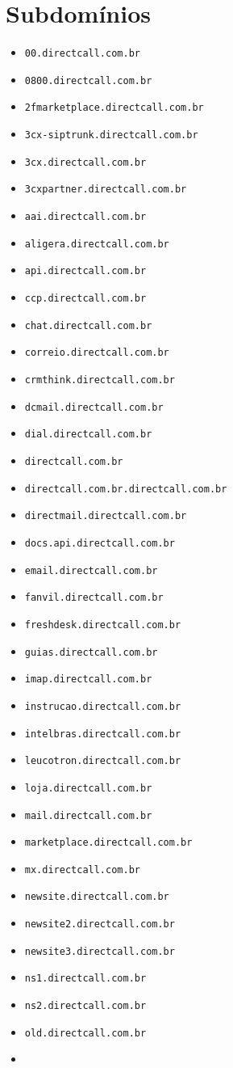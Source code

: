 
\section{Subdomínios}
\begin{multicols}{2}  %
\begin{itemize}
\item \texttt{00.directcall.com.br}\item \texttt{0800.directcall.com.br}\item \texttt{2fmarketplace.directcall.com.br}\item \texttt{3cx-siptrunk.directcall.com.br}\item \texttt{3cx.directcall.com.br}\item \texttt{3cxpartner.directcall.com.br}\item \texttt{aai.directcall.com.br}\item \texttt{aligera.directcall.com.br}\item \texttt{api.directcall.com.br}\item \texttt{ccp.directcall.com.br}\item \texttt{chat.directcall.com.br}\item \texttt{correio.directcall.com.br}\item \texttt{crmthink.directcall.com.br}\item \texttt{dcmail.directcall.com.br}\item \texttt{dial.directcall.com.br}\item \texttt{directcall.com.br}\item \texttt{directcall.com.br.directcall.com.br}\item \texttt{directmail.directcall.com.br}\item \texttt{docs.api.directcall.com.br}\item \texttt{email.directcall.com.br}\item \texttt{fanvil.directcall.com.br}\item \texttt{freshdesk.directcall.com.br}\item \texttt{guias.directcall.com.br}\item \texttt{imap.directcall.com.br}\item \texttt{instrucao.directcall.com.br}\item \texttt{intelbras.directcall.com.br}\item \texttt{leucotron.directcall.com.br}\item \texttt{loja.directcall.com.br}\item \texttt{mail.directcall.com.br}\item \texttt{marketplace.directcall.com.br}\item \texttt{mx.directcall.com.br}\item \texttt{newsite.directcall.com.br}\item \texttt{newsite2.directcall.com.br}\item \texttt{newsite3.directcall.com.br}\item \texttt{ns1.directcall.com.br}\item \texttt{ns2.directcall.com.br}\item \texttt{old.directcall.com.br}\item 
\end{itemize}
\end{multicols}
